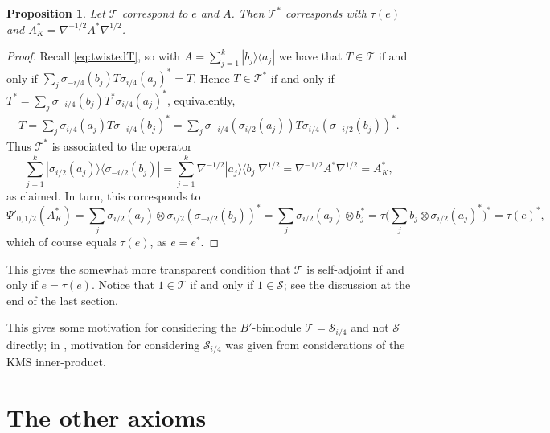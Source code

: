 \documentclass[a4paper,11pt]{article}
\theoremstyle{plain}
\newtheorem{proposition}{Proposition}[section]
\theoremstyle{remark}
\newcommand{\mc}[1]{\mathcal{#1}}
\begin{document}
\begin{proposition}
Let $\mc T$ correspond to $e$ and $A$.  Then $\mc T^*$ corresponds with $\tau(e)$ and $A^*_K = \nabla^{-1/2} A^* \nabla^{1/2}$.
\end{proposition}
\begin{proof}
Recall \eqref{eq:twistedT}, so with $A = \sum_{j=1}^k | b_j \rangle \langle a_j |$ we have that $T\in\mc T$ if and only if $\sum_j \sigma_{-i/4}(b_j) T \sigma_{i/4}(a_j)^* = T$.  Hence $T\in\mc T^*$ if and only if $T^* = \sum_j \sigma_{-i/4}(b_j) T^* \sigma_{i/4}(a_j)^*$, equivalently,
\begin{align*}
T = \sum_j \sigma_{i/4}(a_j) T \sigma_{-i/4}(b_j)^*
= \sum_j \sigma_{-i/4}(\sigma_{i/2}(a_j)) T \sigma_{i/4}(\sigma_{-i/2}(b_j))^*  .
\end{align*}
Thus $\mc T^*$ is associated to the operator
\[ \sum_{j=1}^k | \sigma_{i/2}(a_j) \rangle \langle \sigma_{-i/2}(b_j) |
= \sum_{j=1}^k \nabla^{-1/2} |a_j\rangle \langle b_j| \nabla^{1/2} = \nabla^{-1/2} A^* \nabla^{1/2} = A^*_K, \]
as claimed.  In turn, this corresponds to
\[ \Psi'_{0,1/2}( A^*_K ) = \sum_j \sigma_{i/2}(a_j) \otimes \sigma_{i/2}(\sigma_{-i/2}(b_j))^* =  \sum_j \sigma_{i/2}(a_j) \otimes b_j^*
= \tau \Big( \sum_j b_j \otimes \sigma_{i/2}(a_j)^* \Big)^*
= \tau(e)^*, \]
which of course equals $\tau(e)$, as $e=e^*$.
\end{proof}

This gives the somewhat more transparent condition that $\mc T$ is self-adjoint if and only if $e = \tau(e)$.  Notice that $1\in\mc T$ if and only if $1\in\mc S$; see the discussion at the end of the last section.

This gives some motivation for considering the $B'$-bimodule $\mc T = \mc S_{i/4}$ and not $\mc S$ directly; in \cite{Wasilewski_Quantum_Cayley}, motivation for considering $\mc S_{i/4}$ was given from considerations of the KMS inner-product.



\section{The other axioms}
\end{document}
